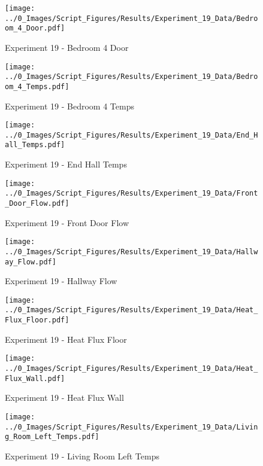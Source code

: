 	\begin{figure}[H]
		\centering
		\texttt{[image: ../0\_Images/Script\_Figures/Results/Experiment\_19\_Data/Bedroom\_4\_Door.pdf]}
		\caption[]{Experiment 19 - Bedroom 4 Door}
	\end{figure}
 
	\clearpage

	\begin{figure}[H]
		\centering
		\texttt{[image: ../0\_Images/Script\_Figures/Results/Experiment\_19\_Data/Bedroom\_4\_Temps.pdf]}
		\caption[]{Experiment 19 - Bedroom 4 Temps}
	\end{figure}
 

	\begin{figure}[H]
		\centering
		\texttt{[image: ../0\_Images/Script\_Figures/Results/Experiment\_19\_Data/End\_Hall\_Temps.pdf]}
		\caption[]{Experiment 19 - End Hall Temps}
	\end{figure}
 
	\clearpage

	\begin{figure}[H]
		\centering
		\texttt{[image: ../0\_Images/Script\_Figures/Results/Experiment\_19\_Data/Front\_Door\_Flow.pdf]}
		\caption[]{Experiment 19 - Front Door Flow}
	\end{figure}
 

	\begin{figure}[H]
		\centering
		\texttt{[image: ../0\_Images/Script\_Figures/Results/Experiment\_19\_Data/Hallway\_Flow.pdf]}
		\caption[]{Experiment 19 - Hallway Flow}
	\end{figure}
 
	\clearpage

	\begin{figure}[H]
		\centering
		\texttt{[image: ../0\_Images/Script\_Figures/Results/Experiment\_19\_Data/Heat\_Flux\_Floor.pdf]}
		\caption[]{Experiment 19 - Heat Flux Floor}
	\end{figure}
 

	\begin{figure}[H]
		\centering
		\texttt{[image: ../0\_Images/Script\_Figures/Results/Experiment\_19\_Data/Heat\_Flux\_Wall.pdf]}
		\caption[]{Experiment 19 - Heat Flux Wall}
	\end{figure}
 
	\clearpage

	\begin{figure}[H]
		\centering
		\texttt{[image: ../0\_Images/Script\_Figures/Results/Experiment\_19\_Data/Living\_Room\_Left\_Temps.pdf]}
		\caption[]{Experiment 19 - Living Room Left Temps}
	\end{figure}
 

